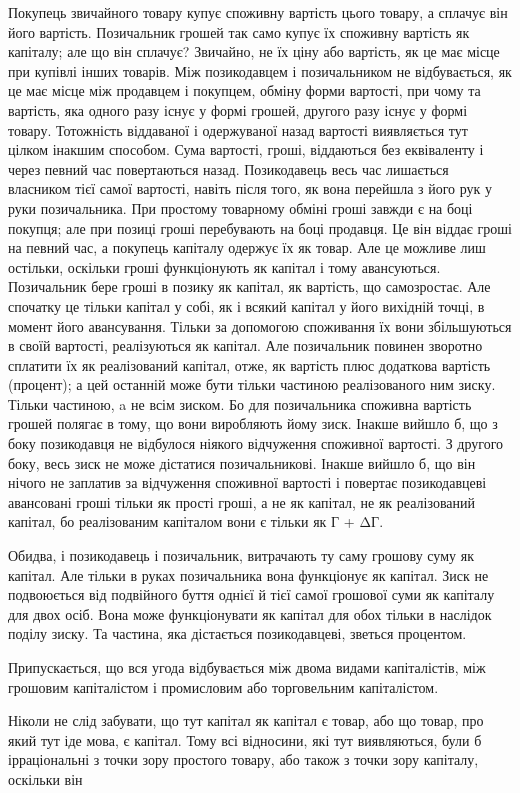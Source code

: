 Покупець звичайного товару купує споживну вартість цього
товару, а сплачує він його вартість. Позичальник грошей так само
купує їх споживну вартість як капіталу; але що він сплачує?
Звичайно, не їх ціну або вартість, як це має місце при купівлі
інших товарів. Між позикодавцем і позичальником не відбувається,
як це має місце між продавцем і покупцем, обміну форми
вартості, при чому та вартість, яка одного разу існує у формі грошей,
другого разу існує у формі товару. Тотожність віддаваної і
одержуваної назад вартості виявляється тут цілком інакшим способом.
Сума вартості, гроші, віддаються без еквіваленту і через
певний час повертаються назад. Позикодавець весь час
лишається власником тієї самої вартості, навіть після того, як вона
перейшла з його рук у руки позичальника. При простому товарному
обміні гроші завжди є на боці покупця; але при позиці гроші
перебувають на боці продавця. Це він віддає гроші на певний
час, а покупець капіталу одержує їх як товар. Але це можливе
лиш остільки, оскільки гроші функціонують як капітал і тому
авансуються. Позичальник бере гроші в позику як капітал, як
вартість, що самозростає. Але спочатку це тільки капітал у
собі, як і всякий капітал у його вихідній точці, в момент його
авансування. Тільки за допомогою споживання їх вони збільшуються
в своїй вартості, реалізуються як капітал. Але позичальник
повинен зворотно сплатити їх як реалізований капітал,
отже, як вартість плюс додаткова вартість (процент); а цей
останній може бути тільки частиною реалізованого ним зиску.
Тільки частиною, a не всім зиском. Бо для позичальника споживна
вартість грошей полягає в тому, що вони виробляють
йому зиск. Інакше вийшло б, що з боку позикодавця не відбулося
ніякого відчуження споживної вартості. З другого боку,
весь зиск не може дістатися позичальникові. Інакше вийшло б,
що він нічого не заплатив за відчуження споживної вартості і
повертає позикодавцеві авансовані гроші тільки як прості гроші,
а не як капітал, не як реалізований капітал, бо реалізованим
капіталом вони є тільки як Г + ΔГ.

Обидва, і позикодавець і позичальник, витрачають ту саму
грошову суму як капітал. Але тільки в руках позичальника вона
функціонує як капітал. Зиск не подвоюється від подвійного
буття однієї й тієї самої грошової суми як капіталу для двох
осіб. Вона може функціонувати як капітал для обох тільки в
наслідок поділу зиску. Та частина, яка дістається позикодавцеві,
зветься процентом.

Припускається, що вся угода відбувається між двома видами
капіталістів, між грошовим капіталістом і промисловим або торговельним
капіталістом.

Ніколи не слід забувати, що тут капітал як капітал є товар,
або що товар, про який тут іде мова, є капітал. Тому всі відносини,
які тут виявляються, були б ірраціональні з точки зору
простого товару, або також з точки зору капіталу, оскільки він
\parbreak{}  %
